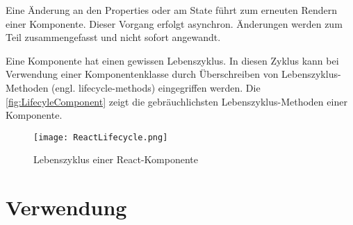 Eine Änderung an den Properties oder am State führt zum erneuten Rendern einer Komponente. Dieser Vorgang erfolgt asynchron. Änderungen werden zum Teil zusammengefasst und nicht sofort angewandt. \autocites[vgl.][71\psqq]{Zeigermann.2016}[vgl.][11\psqq]{Stefanov.2017}

Eine Komponente hat einen gewissen Lebenszyklus. In diesen Zyklus kann bei Verwendung einer Komponentenklasse durch Überschreiben von Lebenszyklus-Methoden (engl. lifecycle-methods) eingegriffen werden. Die \autoref{fig:LifecyleComponent} zeigt die gebräuchlichsten Lebenszyklus-Methoden einer Komponente.


\begin{figure}
	\centering
	\texttt{[image: ReactLifecycle.png]}
	\caption{Lebenszyklus einer  React-Komponente} 
	\label{fig:LifecyleComponent}
\end{figure}


   


  

\section{Verwendung}


